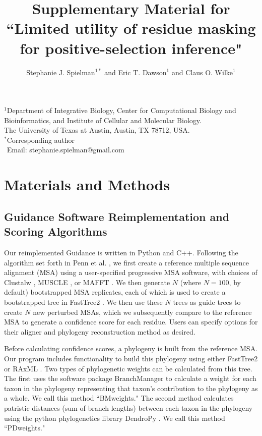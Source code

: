 \documentclass[11pt]{article}
\begin{document}
\title{\textbf{Supplementary Material for ``Limited utility of residue masking for positive-selection inference"}}
\author{Stephanie J. Spielman$^{1*}$ and Eric T. Dawson$^{1}$ and Claus O. Wilke$^{1}$}
\date{}
\maketitle
\noindent $^1$Department of Integrative Biology, Center for Computational Biology and Bioinformatics, and Institute of Cellular and Molecular Biology.
\\ The University of Texas at Austin, Austin, TX 78712, USA.\\

\bigskip
\noindent
$^*$Corresponding author\\
$\phantom{^*}$Email: stephanie.spielman@gmail.com\\

\bigskip
\tableofcontents

\newpage 

\section{Materials and Methods}

\subsection*{Guidance Software Reimplementation and Scoring Algorithms}
Our reimplemented Guidance is written in Python and C++. Following the algorithm set forth in Penn et al. \citep{Penn2010}, we first create a reference multiple sequence alignment (MSA) using a user-specified progressive MSA software, with choices of Clustalw \citep{Thompson1994}, MUSCLE \citep{Edgar2004}, or MAFFT \citep{Katoh2002, Katoh2005}. We then generate $N$ (where $N=100$, by default) bootstrapped MSA replicates, each of which is used to create a bootstrapped tree in FastTree2 \citep{Price2010}. We then use these $N$ trees as guide trees to create $N$ new perturbed MSAs, which we subsequently compare to the reference MSA to generate a confidence score for each residue. Users can specify options for their aligner and phylogeny reconstruction method as desired.

Before calculating confidence scores, a phylogeny is built from the reference MSA. Our program includes functionality to build this phylogeny using either FastTree2 \citep{Price2010} or RAxML \citep{Stamatakis2006}. Two types of phylogenetic weights can be calculated from this tree. The first uses the software package BranchManager \citep{Stone2007} to calculate a weight for each taxon in the phylogeny representing that taxon's contribution to the phylogeny as a whole. We call this method ``BMweights." The second method calculates patristic distances (sum of branch lengths) between each taxon in the phylogeny using the python phylogenetics library DendroPy \citep{Sukumaran2010}. We call this method ``PDweights."
\end{document}
